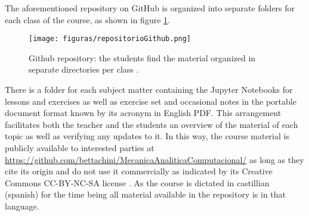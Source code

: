 
The aforementioned repository on GitHub is organized into separate folders for each class of the course, as shown in figure \ref{fig:github}.

\begin{figure}[!ht]
\centering
\texttt{[image: figuras/repositorioGithub.png]}
\caption{Github repository: the students find the material organized in separate directories per class \cite{repositorio-victor}.}
\label{fig:github}
\end{figure}

There is a folder for each subject matter containing the Jupyter Notebooks for lessons and exercises as well as exercise set and occasional notes in the portable document format known by its acronym in English PDF.
This arrangement facilitates both the teacher and the students an overview of the material of each topic as well as verifying any updates to it.
In this way, the course material is publicly available to interested parties at \url{https://github.com/bettachini/MecanicaAnaliticaComputacional/} \cite{repositorio-victor} as long as they cite its origin and do not use it commercially as indicated by its Creative Commons CC-BY-NC-SA license \cite{creative}.
As the course is dictated in castillian (spanish) for the time being all material available in the repository is in that language.
